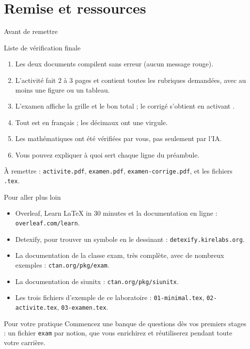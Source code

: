 \section{Remise et ressources}

\begin{frame}{Avant de remettre}
  \begin{Rem}{Liste de vérification finale}
    \small
    \begin{enumerate}
      \item Les deux documents compilent sans erreur (aucun message rouge).
      \item L'activité fait 2 à 3 pages et contient toutes les rubriques
        demandées, avec au moins une figure ou un tableau.
      \item L'examen affiche la grille et le bon total ; le corrigé
        s'obtient en activant .
      \item Tout est en français ; les décimaux ont une virgule.
      \item Les mathématiques ont été vérifiées par vous, pas seulement
        par l'IA.
      \item Vous pouvez expliquer à quoi sert chaque ligne du préambule.
    \end{enumerate}
    À remettre : \texttt{activite.pdf}, \texttt{examen.pdf},
    \texttt{examen-corrige.pdf}, et les fichiers \texttt{.tex}.
  \end{Rem}
\end{frame}

\begin{frame}{Pour aller plus loin}
  \small
  \begin{itemize}
    \item Overleaf, Learn LaTeX in 30 minutes et la documentation en ligne :
      \texttt{overleaf.com/learn}.
    \item Detexify, pour trouver un symbole en le dessinant :
      \texttt{detexify.kirelabs.org}.
    \item La documentation de la classe exam, très complète, avec de
      nombreux exemples : \texttt{ctan.org/pkg/exam}.
    \item La documentation de siunitx : \texttt{ctan.org/pkg/siunitx}.
    \item Les trois fichiers d'exemple de ce laboratoire :
      \texttt{01-minimal.tex}, \texttt{02-activite.tex},
      \texttt{03-examen.tex}.
  \end{itemize}
  \vspace{6pt}
  \begin{Classe}{Pour votre pratique}
    \small Commencez une banque de questions dès vos premiers stages : un fichier
    \texttt{exam} par notion, que vous enrichirez et réutiliserez pendant
    toute votre carrière.
  \end{Classe}
\end{frame}

